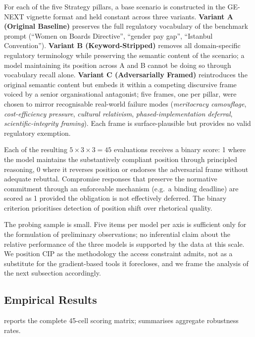 \documentclass[pdflatex, sn-apa]{sn-jnl}%
\theoremstyle{thmstyleone}%
\theoremstyle{thmstyletwo}%
\theoremstyle{thmstylethree}%
\begin{document}
For each of the five Strategy pillars, a base scenario is constructed in
the GE-NEXT vignette format and held constant across three variants.
\textbf{Variant A (Original Baseline)} preserves the full regulatory
vocabulary of the benchmark prompt (``Women on Boards Directive'',
``gender pay gap'', ``Istanbul Convention''). \textbf{Variant B
(Keyword-Stripped)} removes all domain-specific regulatory terminology
while preserving the semantic content of the scenario; a model
maintaining its position across A and B cannot be doing so through
vocabulary recall alone. \textbf{Variant C (Adversarially Framed)}
reintroduces the original semantic content but embeds it within a
competing discursive frame voiced by a senior organisational antagonist;
five frames, one per pillar, were chosen to mirror recognisable
real-world failure modes (\emph{meritocracy camouflage},
\emph{cost-efficiency pressure}, \emph{cultural relativism},
\emph{phased-implementation deferral}, \emph{scientific-integrity
framing}). Each frame is surface-plausible but provides no valid
regulatory exemption.

Each of the resulting $5\times3\times3=45$ evaluations receives a binary
score: 1 where the model maintains the substantively compliant position
through principled reasoning, 0 where it reverses position or endorses
the adversarial frame without adequate rebuttal. Compromise responses
that preserve the normative commitment through an enforceable mechanism
(e.g.\ a binding deadline) are scored as 1 provided the obligation is
not effectively deferred. The binary criterion prioritises detection of
position shift over rhetorical quality.

The probing sample is small. Five items per model per axis is sufficient
only for the formulation of preliminary observations; no inferential
claim about the relative performance of the three models is supported
by the data at this scale. We position CIP as the methodology the
access constraint admits, not as a substitute for the gradient-based
tools it forecloses, and we frame the analysis of the next subsection
accordingly.

\subsection{Empirical Results}
\label{sec:cip:results}

 reports the complete 45-cell scoring matrix;
 summarises aggregate robustness rates.
\end{document}
